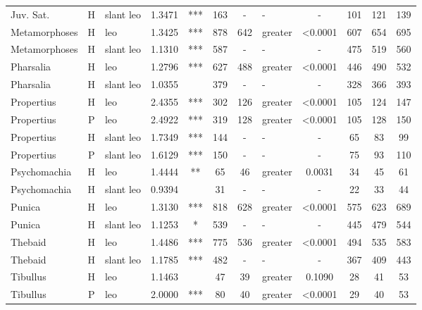 \documentclass[twocolumn, switch]{article} %
\begin{document}
\begin{table}[h!]
\begin{tabular}{lclcccclcc@{\hspace{1\tabcolsep}}c@{\hspace{1\tabcolsep}}c}
     Juv. Sat. &     H &  slant leo & 1.3471 &   *** &  163 &         - &        - & - &  101 &  121 &  139 \\
 Metamorphoses &     H &        leo & 1.3425 &   *** &  878 &       642 &     greater & <0.0001 &  607 &  654 &  695 \\
 Metamorphoses &     H &  slant leo & 1.1310 &   *** &  587 &         - &        - & - &  475 &  519 &  560 \\
     Pharsalia &     H &        leo & 1.2796 &   *** &  627 &       488 &     greater & <0.0001 &  446 &  490 &  532 \\
     Pharsalia &     H &  slant leo & 1.0355 &       &  379 &         - &        - & - &  328 &  366 &  393 \\
    Propertius &     H &        leo & 2.4355 &   *** &  302 &       126 &     greater & <0.0001 &  105 &  124 &  147 \\
    Propertius &     P &        leo & 2.4922 &   *** &  319 &       128 &     greater & <0.0001 &  105 &  128 &  150 \\
    Propertius &     H &  slant leo & 1.7349 &   *** &  144 &         - &        - & - &   65 &   83 &   99 \\
    Propertius &     P &  slant leo & 1.6129 &   *** &  150 &         - &        - & - &   75 &   93 &  110 \\
  Psychomachia &     H &        leo & 1.4444 &    ** &   65 &        46 &     greater & 0.0031 &   34 &   45 &   61 \\
  Psychomachia &     H &  slant leo & 0.9394 &       &   31 &         - &        - & - &   22 &   33 &   44 \\
        Punica &     H &        leo & 1.3130 &   *** &  818 &       628 &     greater & <0.0001 &  575 &  623 &  689 \\
        Punica &     H &  slant leo & 1.1253 &     * &  539 &         - &        - & - &  445 &  479 &  544 \\
       Thebaid &     H &        leo & 1.4486 &   *** &  775 &       536 &     greater & <0.0001 &  494 &  535 &  583 \\
       Thebaid &     H &  slant leo & 1.1785 &   *** &  482 &         - &        - & - &  367 &  409 &  443 \\
      Tibullus &     H &        leo & 1.1463 &       &   47 &        39 &     greater & 0.1090 &   28 &   41 &   53 \\
      Tibullus &     P &        leo & 2.0000 &   *** &   80 &        40 &     greater & <0.0001 &   29 &   40 &   53 \\

\end{tabular}
\end{table}
\end{document}
